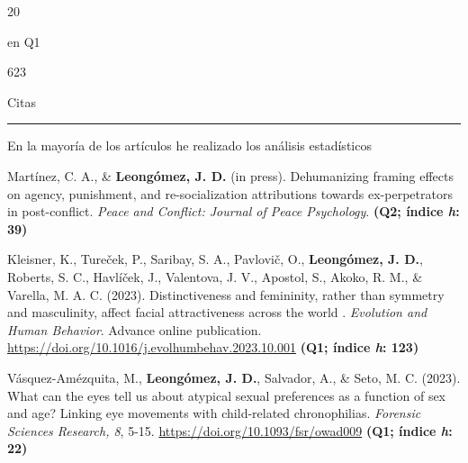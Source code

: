 \documentclass[11pt,a4paper,]{awesome-cv}
\begin{document}
\begin{tcolorbox}[enhanced,
        on line, 
        boxsep=4pt, left=0pt,right=0pt,top=0pt,bottom=0pt,
        colframe=white,colback=blue,
        hyperurl={https://scholar.google.com/citations?user=8Q0jKHsAAAAJ}]
\begin{minipage}[c]{0.12\linewidth}
  \begin{center} \begin{huge} 20 \end{huge}
  \begin{small} en Q1 \end{small} \end{center}
\end{minipage} \begin{minipage}[c]{0.18\linewidth}  
  \begin{center} \begin{huge} 623 \end{huge} 
  \begin{small} Citas \end{small} \end{center}
\end{minipage}
\begin{center}
\noindent\rule{8cm}{0.4pt}
\end{center}
\begin{center}
\footnotesize{En la mayoría de los artículos he realizado los análisis estadísticos}\end{center}
\end{tcolorbox}

\begingroup
\footnotesize
\setlength{\parindent}{-0.5in}
\setlength{\leftskip}{0.5in}

Martínez, C. A., \& \textbf{Leongómez, J. D.} (in press). Dehumanizing
framing effects on agency, punishment, and re-socialization attributions
towards ex-perpetrators in post-conflict. \emph{Peace and Conflict:
Journal of Peace Psychology}. \textbf{(Q2; índice \emph{h}: 39)}

Kleisner, K., Tureček, P., Saribay, S. A., Pavlovič, O.,
\textbf{Leongómez, J. D.}, Roberts, S. C., Havlíček, J., Valentova, J.
V., Apostol, S., Akoko, R. M., \& Varella, M. A. C. (2023).
Distinctiveness and femininity, rather than symmetry and masculinity,
affect facial attractiveness across the world . \emph{Evolution and
Human Behavior}. Advance online publication.
\href{https://authors.elsevier.com/c/1hyfr3tz492kal}{https://doi.org/10.1016/j.evolhumbehav.2023.10.001}
\textbf{(Q1; índice \emph{h}: 123)}

Vásquez-Amézquita, M., \textbf{Leongómez, J. D.}, Salvador, A., \& Seto,
M. C. (2023). What can the eyes tell us about atypical sexual
preferences as a function of sex and age? Linking eye movements with
child-related chronophilias. \emph{Forensic Sciences Research, 8}, 5-15.
\url{https://doi.org/10.1093/fsr/owad009} \textbf{(Q1; índice \emph{h}:
22)}
\end{document}
